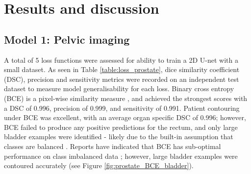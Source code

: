 \chapter{Results and discussion}
\label{ch:results}

\section{Model 1: Pelvic imaging}
A total of 5 loss functions were assessed for ability to train a 2D U-net with a small dataset. As seen in Table \ref{table:loss_prostate}, dice similarity coefficient (DSC), precision and sensitivity metrics were recorded on an independent test dataset to measure model generalisability for each loss. Binary cross entropy (BCE) is a pixel-wise similarity measure \cite{Bertels2019},
and achieved the strongest scores with a DSC of 0.996, precision of 0.999, and sensitivity of 0.991. Patient contouring under BCE was excellent,
with an average organ specific DSC of 0.996; however, BCE failed to produce any positive predictions for the rectum, and only large bladder examples were identified - likely due to the built-in assumption that classes are balanced \cite{Ronneberger_2015}. Reports have indicated that BCE has sub-optimal performance on class imbalanced data \cite{taghanaki2018}; however, large bladder examples were contoured accurately
(see Figure \ref{fig:prostate_BCE_bladder}).  


